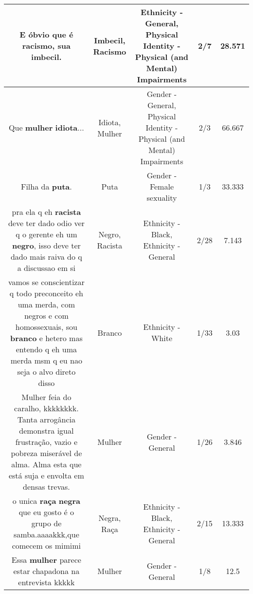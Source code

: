 \documentclass[11pt]{article}
\newlength\mylength
\begin{document}
\begin{center}
\begin{longtable}{|C{.65\mylength}|C{.30\mylength}|C{.12\mylength}|C{.12\mylength}|C{.12\mylength}|}
  \small E óbvio que é \textbf{racismo}, sua \textbf{imbecil}.\normalsize   & Imbecil, Racismo & Ethnicity - General, Physical Identity - Physical (and Mental) Impairments & 2/7 & 28.571 \\  \hline
  \small Que \textbf{mulher} \textbf{idiota}...\normalsize   & Idiota, Mulher & Gender - General, Physical Identity - Physical (and Mental) Impairments & 2/3 & 66.667 \\  \hline
  \small Filha da \textbf{puta}.\normalsize   & Puta & Gender - Female sexuality & 1/3 & 33.333 \\  \hline
  \small pra ela q eh \textbf{racista} deve ter dado odio ver q o gerente eh um \textbf{negro}, isso deve ter dado mais raiva do q a discussao em si\normalsize   & Negro, Racista & Ethnicity - Black, Ethnicity - General & 2/28 & 7.143 \\  \hline
  \small vamos se conscientizar q todo preconceito eh uma merda, com negros e com homossexuais, sou \textbf{branco} e hetero mas entendo q eh uma merda msm q eu nao seja o alvo direto disso\normalsize   & Branco & Ethnicity - White & 1/33 & 3.03 \\  \hline
  \small Mulher feia do caralho, kkkkkkkk. Tanta arrogância demonstra igual frustração, vazio e pobreza miserável de alma. Alma esta que está suja e envolta em densas trevas.\normalsize   & Mulher & Gender - General & 1/26 & 3.846 \\  \hline
  \small o unica \textbf{raça} \textbf{negra} que eu gosto é o grupo de samba.aaaakkk,que comecem os mimimi\normalsize   & Negra, Raça & Ethnicity - Black, Ethnicity - General & 2/15 & 13.333 \\  \hline
  \small Essa \textbf{mulher} parece estar chapadona na entrevista kkkkk\normalsize   & Mulher & Gender - General & 1/8 & 12.5 \\  \hline

\end{longtable}
\end{center}
\end{document}
